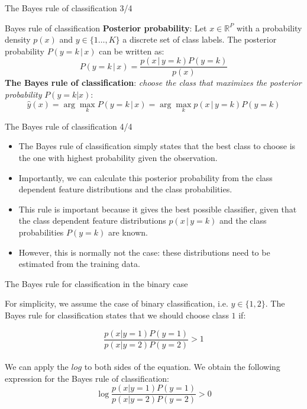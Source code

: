 \documentclass[xcolor=pdftex,dvipsnames,table]{beamer}
\begin{document}
\begin{frame}{The Bayes rule of classification 3/4}

\begin{block}{Bayes rule of classification}
	\textbf{Posterior probability}: Let $x \in \mathbb{R}^P$ with a probability density $p(x)$ and $y \in \{1 \ldots, K\}$ a discrete set of class labels. The posterior probability $P(y=k\,|\,x)$ can be written as:
	\begin{equation}
		P(y=k \, | \, x) = \frac{p(x \, | \, y=k) P(y=k)}{p(x)}
	\end{equation}
	\textbf{The Bayes rule of classification}: \emph{choose the class that maximizes the posterior probability} $P(y=k|x)$:
	\begin{equation}
		\hat{y}(x) = \arg\max_k P(y=k \, | \, x) = \arg\max_k p(x\,|\,y=k)P(y=k)
	\end{equation}
\end{block}

\end{frame}


\begin{frame}{The Bayes rule of classification 4/4}

\begin{itemize}
\item The Bayes rule of classification simply states that the best class to choose is the one with highest probability given the observation.
\item Importantly, we can calculate this posterior probability from the class dependent feature distributions and the class probabilities.
\item This rule is important because it gives the best possible classifier, given that the class dependent feature distributions $p(x\,|\,y=k)$ and the class probabilities $P(y=k)$ are known.
\item However, this is normally not the case: these distributions need to be estimated from the training data.

\end{itemize}

\end{frame}

\begin{frame}{The Bayes rule for classification in the binary case}

For simplicity, we assume the case of binary classification, i.e. $y \in \{1, 2\}$. The Bayes rule for classification states that we should choose class $1$ if:

\begin{equation*}
\frac{p(x|y=1)P(y=1)}{p(x|y=2)P(y=2)} > 1
\end{equation*}
\\
We can apply the $log$ to both sides of the equation. We obtain the following expression for the Bayes rule of classification:
\begin{equation}\label{equ:lda:condition}
\log{ \frac{p(x|y=1)P(y=1)}{p(x|y=2)P(y=2)} } > 0
\end{equation}

\end{frame}
\end{document}

